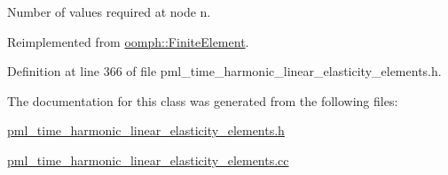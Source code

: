 Number of values required at node n. 



Reimplemented from \hyperlink{classoomph_1_1FiniteElement_a56610c60d5bc2d7c27407a1455471b1a}{oomph\+::\+Finite\+Element}.



Definition at line 366 of file pml\+\_\+time\+\_\+harmonic\+\_\+linear\+\_\+elasticity\+\_\+elements.\+h.



The documentation for this class was generated from the following files\+:\begin{DoxyCompactItemize}
\item 
\hyperlink{pml__time__harmonic__linear__elasticity__elements_8h}{pml\+\_\+time\+\_\+harmonic\+\_\+linear\+\_\+elasticity\+\_\+elements.\+h}\item 
\hyperlink{pml__time__harmonic__linear__elasticity__elements_8cc}{pml\+\_\+time\+\_\+harmonic\+\_\+linear\+\_\+elasticity\+\_\+elements.\+cc}\end{DoxyCompactItemize}

